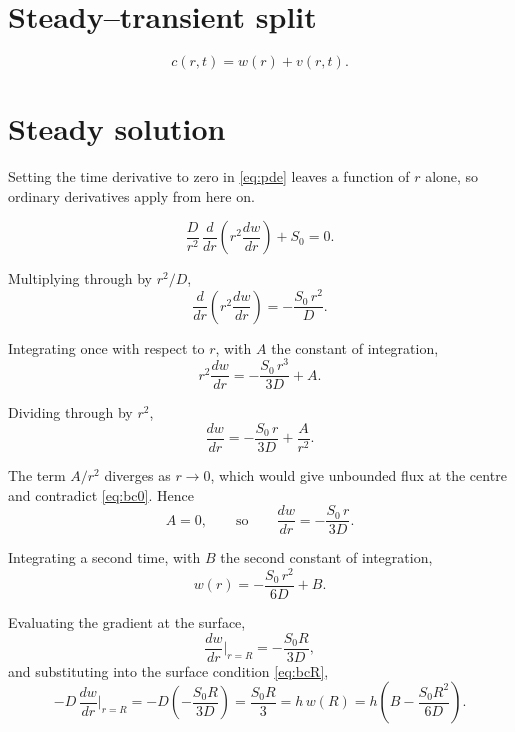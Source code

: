 \documentclass[11pt,a4paper]{article}
\begin{document}
\section{Steady--transient split}

\begin{equation}
c(r,t) = w(r) + v(r,t) .
\label{eq:split}
\end{equation}

\section{Steady solution}

Setting the time derivative to zero in \eqref{eq:pde} leaves a function of $r$
alone, so ordinary derivatives apply from here on.

\begin{equation}
\frac{D}{r^{2}}\,\frac{d}{dr}\!\left(r^{2}\frac{dw}{dr}\right) + S_{0} = 0 .
\end{equation}

Multiplying through by $r^{2}/D$,
\begin{equation}
\frac{d}{dr}\!\left(r^{2}\frac{dw}{dr}\right) = -\frac{S_{0}\,r^{2}}{D} .
\end{equation}

Integrating once with respect to $r$, with $A$ the constant of integration,
\begin{equation}
r^{2}\frac{dw}{dr} = -\frac{S_{0}\,r^{3}}{3D} + A .
\end{equation}

Dividing through by $r^{2}$,
\begin{equation}
\frac{dw}{dr} = -\frac{S_{0}\,r}{3D} + \frac{A}{r^{2}} .
\end{equation}

The term $A/r^{2}$ diverges as $r \to 0$, which would give unbounded flux at the
centre and contradict \eqref{eq:bc0}. Hence
\begin{equation}
A = 0 ,
\qquad\text{so}\qquad
\frac{dw}{dr} = -\frac{S_{0}\,r}{3D} .
\end{equation}

Integrating a second time, with $B$ the second constant of integration,
\begin{equation}
w(r) = -\frac{S_{0}\,r^{2}}{6D} + B .
\end{equation}

Evaluating the gradient at the surface,
\begin{equation}
\frac{dw}{dr}\bigg|_{r=R} = -\frac{S_{0}R}{3D} ,
\end{equation}
and substituting into the surface condition \eqref{eq:bcR},
\begin{equation}
-D\,\frac{dw}{dr}\bigg|_{r=R}
= -D\left(-\frac{S_{0}R}{3D}\right)
= \frac{S_{0}R}{3}
= h\,w(R)
= h\left(B - \frac{S_{0}R^{2}}{6D}\right) .
\end{equation}
\end{document}
